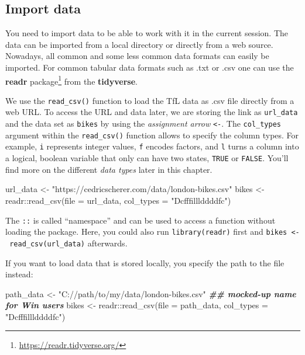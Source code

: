 \documentclass[
]{krantz}
\makeatletter
\newenvironment{Shaded}{\begin{snugshade}}{\end{snugshade}}
\newcommand{\AttributeTok}[1]{\textcolor[rgb]{0.61,0.61,0.61}{#1}}
\newcommand{\DocumentationTok}[1]{\textcolor[rgb]{0.37,0.37,0.37}{\textbf{\textit{#1}}}}
\newcommand{\FunctionTok}[1]{\textcolor[rgb]{0,0,0}{#1}}
\newcommand{\NormalTok}[1]{#1}
\newcommand{\OtherTok}[1]{\textcolor[rgb]{0.37,0.37,0.37}{#1}}
\newcommand{\SpecialCharTok}[1]{\textcolor[rgb]{0,0,0}{#1}}
\newcommand{\StringTok}[1]{\textcolor[rgb]{0.5,0.5,0.5}{#1}}
\renewcommand{\href}[2]{#2\footnote{\url{#1}}}
\newenvironment{kframe}{%
\medskip{}
\setlength{\fboxsep}{.8em}
 \def\at@end@of@kframe{}%
 \ifinner\ifhmode%
  \def\at@end@of@kframe{\end{minipage}}%
  \begin{minipage}{\columnwidth}%
 \fi\fi%
 \def\FrameCommand##1{\hskip\@totalleftmargin \hskip-\fboxsep
 \colorbox{shadecolor}{##1}\hskip-\fboxsep
     \hskip-\linewidth \hskip-\@totalleftmargin \hskip\columnwidth}%
 \MakeFramed {\advance\hsize-\width
   \@totalleftmargin\z@ \linewidth\hsize
   \@setminipage}}%
 {\par\unskip\endMakeFramed%
 \at@end@of@kframe}
\renewenvironment{Shaded}{\begin{kframe}}{\end{kframe}}
\makeatother
\begin{document}
\hypertarget{import}{%
\subsection{Import data}\label{import}}

You need to import data to be able to work with it in the current session. The data can be imported from a local directory or directly from a web source. Nowadays, all common and some less common data formats can easily be imported. For common tabular data formats such as .txt or .csv one can use the \href{https://readr.tidyverse.org/}{\textbf{readr} package} \citep{readr} from the \textbf{tidyverse}.

We use the \texttt{read\_csv()} function to load the TfL data as .csv file directly from a web URL. To access the URL and data later, we are storing the link as \texttt{url\_data} and the data set as \texttt{bikes} by using the \emph{assignment arrow} \texttt{\textless{}-}. The \texttt{col\_types} argument within the \texttt{read\_csv()} function allows to specify the column types. For example, \texttt{i} represents integer values, \texttt{f} encodes factors, and \texttt{l} turns a column into a logical, boolean variable that only can have two states, \texttt{TRUE} or \texttt{FALSE}. You'll find more on the different \emph{data types} later in this chapter.

\begin{Shaded}
\begin{Highlighting}[]
\NormalTok{url\_data }\OtherTok{\textless{}{-}} \StringTok{"https://cedricscherer.com/data/london{-}bikes.csv"}
\NormalTok{bikes }\OtherTok{\textless{}{-}}\NormalTok{ readr}\SpecialCharTok{::}\FunctionTok{read\_csv}\NormalTok{(}\AttributeTok{file =}\NormalTok{ url\_data, }\AttributeTok{col\_types =} \StringTok{"Dcfffilllddddfc"}\NormalTok{)}
\end{Highlighting}
\end{Shaded}

The \texttt{::} is called ``namespace'' and can be used to access a function without loading the package. Here, you could also run \texttt{library(readr)} first and \texttt{bikes\ \textless{}-\ read\_csv(url\_data)} afterwards.

If you want to load data that is stored locally, you specify the path to the file instead:

\begin{Shaded}
\begin{Highlighting}[]
\NormalTok{path\_data }\OtherTok{\textless{}{-}} \StringTok{"C://path/to/my/data/london{-}bikes.csv"} \DocumentationTok{\#\# mocked{-}up name for Win users}
\NormalTok{bikes }\OtherTok{\textless{}{-}}\NormalTok{ readr}\SpecialCharTok{::}\FunctionTok{read\_csv}\NormalTok{(}\AttributeTok{file =}\NormalTok{ path\_data, }\AttributeTok{col\_types =} \StringTok{"Dcfffilllddddfc"}\NormalTok{)}
\end{Highlighting}
\end{Shaded}
\end{document}
